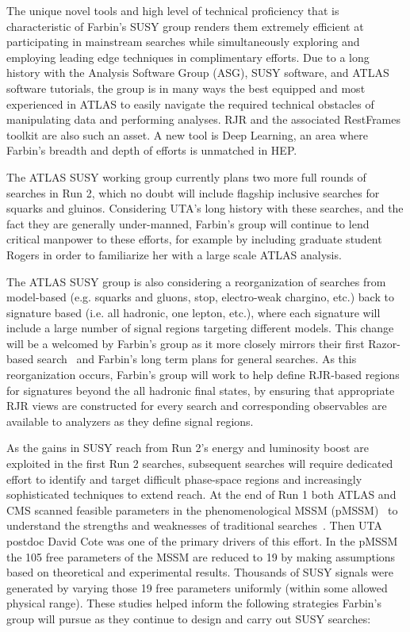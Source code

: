 
The unique novel tools and high level of technical proficiency that is
characteristic of Farbin's SUSY group renders them extremely
efficient at participating in mainstream searches while simultaneously
exploring and employing leading edge techniques in complimentary
efforts.  Due to a long history with the Analysis Software Group
(ASG), SUSY software, and ATLAS software tutorials, the group is in
many ways the best equipped and most experienced in ATLAS to easily
navigate the required technical obstacles of manipulating data and
performing analyses. RJR and the associated RestFrames~\cite{} toolkit
are also such an asset. A new tool is Deep Learning, an area where
Farbin's breadth and depth of efforts is unmatched in HEP.

The ATLAS SUSY working group currently plans two more full rounds of
searches in Run 2, which no doubt will include flagship inclusive
searches for squarks and gluinos. Considering UTA's long history with
these searches, and the fact they are generally under-manned, Farbin's
group will continue to lend critical manpower to these efforts, for
example by including graduate student Rogers in order to familiarize
her with a large scale ATLAS analysis.

The ATLAS SUSY group is also considering a reorganization of searches
from model-based (e.g. squarks and gluons, stop, electro-weak
chargino, etc.) back to signature based (i.e. all hadronic, one
lepton, etc.), where each signature will include a large number of
signal regions targeting different models. This change will be a
welcomed by Farbin's group as it more closely mirrors their first
Razor-based search~\cite{Aad:2012naa} and Farbin's long term plans for
general searches. As this reorganization occurs, Farbin's group will
work to help define RJR-based regions for signatures beyond the all
hadronic final states, by ensuring that appropriate RJR views are
constructed for every search and corresponding observables are
available to analyzers as they define signal regions. 

As the gains in SUSY reach from Run 2's energy and luminosity boost
are exploited in the first Run 2 searches, subsequent searches will
require dedicated effort to identify and target difficult phase-space
regions and increasingly sophisticated techniques to extend reach.  At
the end of Run 1 both ATLAS and CMS scanned feasible parameters in the
phenomenological MSSM (pMSSM)~\cite{Djouadi:1998di,Berger:2008cq} to
understand the strengths and weaknesses of traditional
searches~\cite{Aad:2015baa,Khachatryan:2016nvf}. Then UTA postdoc
David Cote was one of the primary drivers of this effort. In the pMSSM
the 105 free parameters of the MSSM are reduced to 19 by making
assumptions based on theoretical and experimental results.  Thousands
of SUSY signals were generated by varying those 19 free parameters
uniformly (within some allowed physical range). These studies helped
inform the following strategies Farbin's group will pursue as they
continue to design and carry out SUSY searches:

